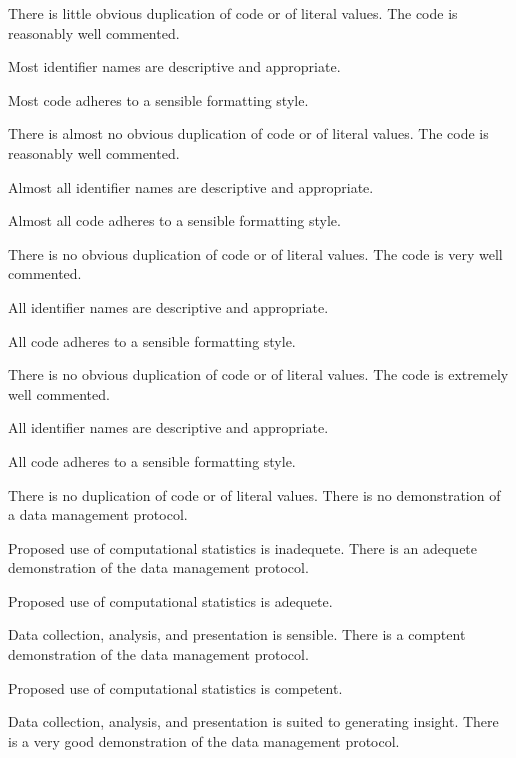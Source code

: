 \begin{markingrubric}
             \par There is little obvious duplication of code or of literal values.           
        \grade The code is reasonably well commented.
            \par Most identifier names are descriptive and appropriate.
            \par Most code adheres to a sensible formatting style.
             \par There is almost no obvious duplication of code or of literal values.   
        \grade The code is reasonably well commented.
            \par Almost all identifier names are descriptive and appropriate.
            \par Almost all code adheres to a sensible formatting style.
             \par There is no obvious duplication of code or of literal values.
        \grade The code is very well commented.
            \par All identifier names are descriptive and appropriate.
            \par All code adheres to a sensible formatting style.
             \par There is no obvious duplication of code or of literal values.
        \grade The code is extremely well commented.
            \par All identifier names are descriptive and appropriate.
            \par All code adheres to a sensible formatting style.
            \par There is no duplication of code or of literal values.
%
        \grade \fail There is no demonstration of a data management protocol.
            \par Proposed use of computational statistics is inadequete.
        \grade There is an adequete demonstration of the data management protocol.
            \par Proposed use of computational statistics is adequete.
            \par Data collection, analysis, and presentation is sensible.        
        \grade There is a comptent demonstration of the data management protocol.
            \par Proposed use of computational statistics is competent.
            \par Data collection, analysis, and presentation is suited to generating insight.
        \grade There is a very good demonstration of the data management protocol.

\end{markingrubric}
